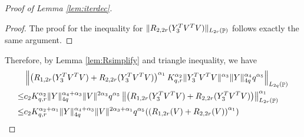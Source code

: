 \documentclass[11pt]{amsart}
\numberwithin{equation}{section}
\numberwithin{equation}{section}
\DeclareMathOperator{\Pb}{\mathbb{P}}
\DeclarePairedDelimiter{\norm}{\lVert}{\rVert}
\newcommand{\norml}[1]{\left\lVert#1\right\rVert}
\begin{document}
\begin{proof}[Proof of Lemma \ref{lem:iterdec}]
\begin{proof}
The proof for the inequality for $\norm{R_{2,2r}(Y_3^TV^TV)}_{L_{2r}(\Pb)}  $ follows exactly the same argument.



\end{proof}

Therefore, by Lemma \ref{lem:Rsimplify} and triangle inequality, we have
\begin{align*}
    &\norml{\left(R_{1,2r}(Y_3^TV^TV)+R_{2,2r}(Y_3^TV^TV)\right)^{\alpha_1}K_{q,r}^{\alpha_2}\norm{Y_3^TV^TV}^{\alpha_3} \norm{Y}_{4q} ^{\alpha_4}q^{\alpha_5}}_{L_{2q}(\Pb)}
    \\ \le &c_2K_{q,r}^{\alpha_2}\norm{Y}_{4q}^{\alpha_4+\alpha_3}\norm{V}^{2 \alpha_3}q^{\alpha_5}\norml{\left(R_{1,2r}(Y_3^TV^TV)+R_{2,2r}(Y_3^TV^TV)\right)}_{L_{2r}(\Pb)}^{\alpha_1}
    \\ \le & c_2 K_{q,r}^{\alpha_2+\alpha_1}\norm{Y}_{4q}^{\alpha_4+\alpha_3}\norm{V}^{2 \alpha_3+\alpha_1}q^{\alpha_5}(\left(R_{1,2r}(V)+R_{2,2r}(V)\right)^{\alpha_1})
\end{align*}


\end{proof}
\end{document}

